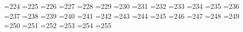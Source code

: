 =224 %
{}=225 %
{}=226 %
{}=227 %
{}=228 %
{}=229 %
{}=230 %
{}=231 %
{}=232 %
{}=233 %
{}=234 %
{}=235 %
{}=236 %
{}=237 %
{}=238 %
{}=239 %
{}=240 %
{}=241 %
{}=242 %
{}=243 %
{}=244 %
{}=245 %
{}=246 %
{}=247 %
{}=248 %
{}=249 %
{}=250 %
{}=251 %
{}=252 %
{}=253 %
{}=254 %
{}=255 %
